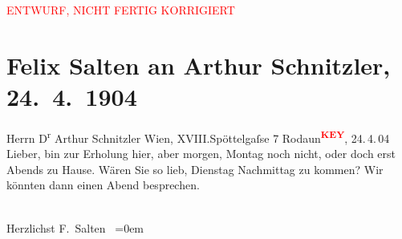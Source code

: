 
\begin{center}
            \textcolor{red}{ENTWURF, NICHT FERTIG KORRIGIERT}
                      \end{center}
            
         \renewcommand{\erwaehnteOrte}{Orte: Edmund-Weiß-Gasse, Wien, XVIII., Währing}
         \renewcommand{\erwaehnteWerke}{}
               \section[Felix Salten an Arthur Schnitzler, 24. 4. 1904]{ Felix Salten an Arthur Schnitzler, 24. 4. 1904}\nopagebreak{}\rehead{ }\begin{ledgroupsized}[t]{13cm}\normalsize\beginnumbering \toendnotes[C]{\smallbreak\pagebreak[2]} 
               Herrn D\textsuperscript{r} Arthur Schnitzler
      \pstart{}Wien, XVIII.\pend{}\pstart{}Spöttelgaſse 7\pend{}{\pb}\pstart
           Rodaun\textcolor{red}{\textsuperscript{\textbf{KEY}}}, 24. 4. 04\pend
           \pstart
           Lieber, bin zur Erholung hier,
      aber morgen, Montag noch
      nicht, oder doch erst Abends
      zu Hause. Wären Sie so
      lieb, Dienstag Nachmittag
      zu kommen? Wir könnten
      dann einen Abend besprechen.
      
            \pend
           \pstart
           {\\[\baselineskip]}Herzlichst \spacefill\mbox{F. Salten
                  }\pend
           \leftskip=0em{}
         
         \endnumbering{}\end{ledgroupsized}\begin{anhang}\end{anhang}\newcommand{\dateiname}{L03396}\newcommand{\titel}{Felix Salten an Arthur Schnitzler, 24. 4. 1904}\newcommand{\editorInnen}{Martin Anton Müller und Laura Untner}
      